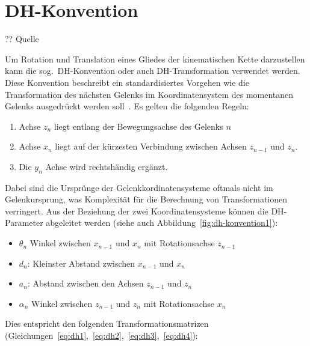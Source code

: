 \section{DH-Konvention}\label{sec:dh-konvention}

?? Quelle


Um Rotation und Translation eines Gliedes der kinematischen Kette darzustellen kann die sog.\ DH-Konvention oder auch DH-Transformation verwendet werden.
Diese Konvention beschreibt ein standardisiertes Vorgehen wie die Transformation des nächsten Gelenks im Koordinatensystem des momentanen Gelenks ausgedrückt werden soll~\cite{denavitKinematicNotationLowerPair1955,craigIntroductionRoboticsMechanics2009}.
Es gelten die folgenden Regeln:

\begin{enumerate}
    \item Achse $z_{n}$ liegt entlang der Bewegungsachse des Gelenks $n$
    \item Achse $x_{n}$ liegt auf der kürzesten Verbindung zwischen Achsen $z_{n-1}$ und $z_{n}$.
    \item Die $y_{n}$ Achse wird rechtshändig ergänzt.
\end{enumerate}

Dabei sind die Ursprünge der Gelenkkordinatensysteme oftmals nicht im Gelenkursprung, was Komplexität für die Berechnung von Transformationen verringert.
Aus der Beziehung der zwei Koordinatensysteme können die DH-Parameter abgeleitet werden (siehe auch Abbildung~\ref{fig:dh-konvention1}):

\begin{itemize}
    \item $\theta_n$ Winkel zwischen $x_{n-1}$ und $x_n$ mit Rotationsachse $z_{n-1}$
    \item $d_n$: Kleinster Abstand zwischen $x_{n-1}$ und $x_n$
    \item $a_n$: Abstand zwischen den Achsen $z_{n-1}$ und $z_n$
    \item $\alpha_n$ Winkel zwischen $z_{n-1}$ und $z_n$ mit Rotationsachse $x_{n}$
\end{itemize}

Dies entspricht den folgenden Transformationsmatrizen (Gleichungen~\ref{eq:dh1},~\ref{eq:dh2},~\ref{eq:dh3},~\ref{eq:dh4}):

\newcommand{\ct}{\cos(\theta_n)}
\newcommand{\st}{\sin(\theta_n)}
\newcommand{\ca}{\cos(\alpha_n)}
\newcommand{\sa}{\sin(\alpha_n)}

